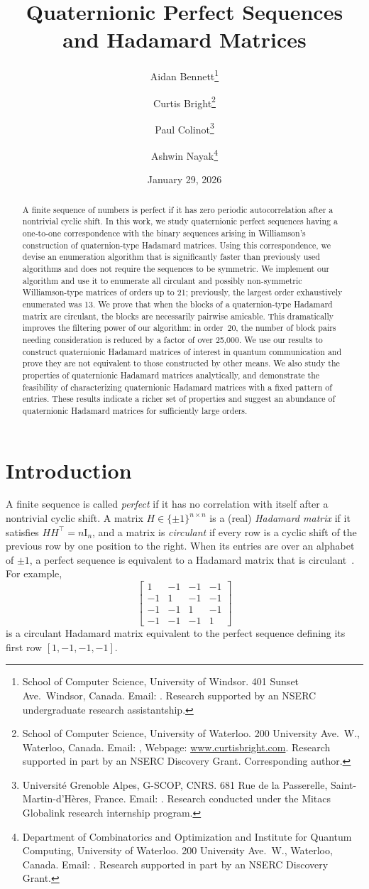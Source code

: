 \documentclass[12pt]{article}
\title{Quaternionic Perfect Sequences \\ and Hadamard Matrices}
\date{January 29, 2026}
\author{Aidan Bennett\thanks{School of Computer Science, University of Windsor.
401 Sunset Ave.\ Windsor,
Canada.
Email: \email{bennet43@uwindsor.ca}.
Research supported by an NSERC undergraduate research assistantship.}
\and
Curtis Bright\thanks{School of Computer Science, University of Waterloo.
200 University Ave.\ W., Waterloo,
Canada.
Email: \email{cbright@uwaterloo.ca}, Webpage: \url{www.curtisbright.com}.
Research supported in part by an NSERC Discovery Grant.
Corresponding author.}
\and
Paul Colinot\thanks{Université Grenoble Alpes, G-SCOP, CNRS\@.
681 Rue de la Passerelle,
Saint-Martin-d'Hères, France.
Email: \email{paul.colinot@grenoble-inp.org}.
Research conducted under the Mitacs Globalink research internship program.}
\and 
Ashwin Nayak\thanks{Department of Combinatorics and Optimization
and Institute for Quantum Computing, University of Waterloo.
200 University Ave.\ W., Waterloo,
Canada.
Email: \email{academic@ashwinnayak.info}. 
Research supported in part by an NSERC Discovery Grant.}
}
\numberwithin{equation}{section}
\newcommand{\id}{{\mathrm I}}
\begin{document}
\maketitle

\begin{abstract}
A finite sequence of numbers is perfect if it has zero periodic autocorrelation after a nontrivial cyclic shift.
In this work, we study quaternionic perfect sequences having a one-to-one correspondence
with the binary sequences arising in Williamson's construction of quaternion-type Hadamard matrices.
Using this correspondence, we devise an enumeration algorithm
that is significantly faster than previously used algorithms and does not require the sequences to be symmetric.
We implement our algorithm and use it to enumerate all circulant and possibly non-symmetric Williamson-type matrices of orders up to 21;
previously, the largest order exhaustively enumerated was 13.
We prove that when the blocks of a quaternion-type Hadamard matrix are circulant,
the blocks are necessarily pairwise amicable. This dramatically improves the filtering power of our algorithm:
in order~20, the number of block pairs needing consideration is reduced by a factor of over 25,000.
We use our results to construct quaternionic Hadamard matrices of interest in quantum communication and prove they are not equivalent to those constructed by other means.
We also study the properties of quaternionic Hadamard matrices analytically,
and demonstrate the feasibility of characterizing quaternionic Hadamard matrices with a fixed pattern of entries.
These results indicate a richer set of properties and suggest an abundance of quaternionic Hadamard matrices for sufficiently large orders.
\end{abstract}

\section{Introduction}\label{sec:intro}

A finite sequence is called \emph{perfect} if it has no correlation with itself after a nontrivial cyclic shift.
A matrix $H\in\{\pm1\}^{n\times n}$ is a (real) \emph{Hadamard matrix} if it satisfies $HH^\top=n\id_n$, and a matrix is \emph{circulant}
if every row is a cyclic shift of the previous row by one position to the right.  
When its entries are over an alphabet of $\pm1$, a perfect sequence is equivalent to a Hadamard matrix that is circulant~\cite{schmidt}.
For example,
\[ \begin{bmatrix}
1 & -1 & -1 & -1 \\
-1 & 1 & -1 & -1 \\
-1 & -1 & 1 & -1 \\
-1 & -1 & -1 & 1
\end{bmatrix} \]
is a circulant Hadamard matrix equivalent to the perfect sequence defining its first row $[1,-1,-1,-1]$.
\end{document}
